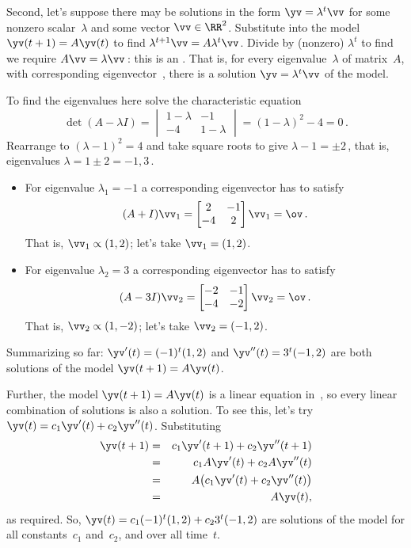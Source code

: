 \begin{example}
\begin{solution}
Second, let's suppose there may be solutions in the form \(\yv=\lambda^t\vv\) for some nonzero scalar~\(\lambda\) and some vector \(\vv\in\RR^2\).
Substitute into the model \(\yv(t+1)=A\yv(t)\) to find \(\lambda^{t+1}\vv=A\lambda^t\vv\). 
Divide by (nonzero) \(\lambda^t\) to find we require \(A\vv=\lambda\vv\)\,: this is an .
That is, for every eigenvalue~\(\lambda\) of matrix~\(A\), with corresponding eigenvector~\vv, there is a solution \(\yv=\lambda^t\vv\) of the model.

To find the eigenvalues here solve the characteristic equation 
\begin{equation*}
\det(A-\lambda I)=\begin{vmatrix} 1-\lambda&-1\\-4&1-\lambda \end{vmatrix}=(1-\lambda)^2-4=0\,.
\end{equation*}
Rearrange to \((\lambda-1)^2=4\) and take square roots to give \(\lambda-1=\pm2\)\,, that is, eigenvalues \(\lambda=1\pm2=-1,3\)\,.
\begin{itemize}
\item For eigenvalue \(\lambda_1=-1\) a corresponding eigenvector has to satisfy
\begin{equation*}
(A+I)\vv_1=\begin{bmatrix} 2&-1\\-4&2 \end{bmatrix}\vv_1=\ov\,.
\end{equation*}
That is, \(\vv_1\propto (1,2)\); let's take \(\vv_1=(1,2)\).

\item For eigenvalue \(\lambda_2=3\) a corresponding eigenvector has to satisfy
\begin{equation*}
(A-3I)\vv_2=\begin{bmatrix} -2&-1\\-4&-2 \end{bmatrix}\vv_2=\ov\,.
\end{equation*}
That is, \(\vv_2\propto (1,-2)\); let's take \(\vv_2=(-1,2)\).
\end{itemize}
Summarizing so far: \(\yv'(t)=(-1)^t(1,2)\) and \(\yv''(t)=3^t(-1,2)\) are both solutions of the model \(\yv(t+1)=A\yv(t)\).

Further, the model \(\yv(t+1)=A\yv(t)\) is a linear equation in~\yv, so every linear combination of solutions is also a solution.
To see this, let's try \(\yv(t)=c_1\yv'(t)+c_2\yv''(t)\).
Substituting
\begin{eqnarray*}
\yv(t+1)&=&c_1\yv'(t+1)+c_2\yv''(t+1)
\\&=&c_1A\yv'(t)+c_2A\yv''(t)
\\&=&A\big(c_1\yv'(t)+c_2\yv''(t)\big)
\\&=&A\yv(t),
\end{eqnarray*}
as required.
So, \(\yv(t)=c_1(-1)^t(1,2)+c_23^t(-1,2)\) are solutions of the model for all constants~\(c_1\) and~\(c_2\), and over all time~\(t\).


\end{solution}
\end{example}
